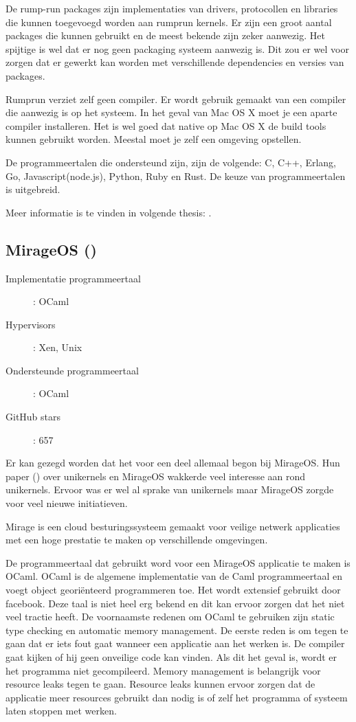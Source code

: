 \documentclass[pdftex,a4paper,12pt,twoside]{report}
\begin{document}
De rump-run packages zijn implementaties van drivers, protocollen en libraries die kunnen toegevoegd worden aan rumprun kernels. Er zijn een groot aantal packages die kunnen gebruikt en de meest bekende zijn zeker aanwezig.
Het spijtige is wel dat er nog geen packaging systeem aanwezig is. Dit zou er wel voor zorgen dat er gewerkt kan worden met verschillende dependencies en versies van packages.

Rumprun verziet zelf geen compiler. Er wordt gebruik gemaakt van een compiler die aanwezig is op het systeem. In het geval van Mac OS X moet je een aparte compiler installeren. Het is wel goed dat native op Mac OS X de build tools kunnen gebruikt worden. Meestal moet je zelf een omgeving opstellen.

De programmeertalen die ondersteund zijn, zijn de volgende: C, C++, Erlang, Go, Javascript(node.js), Python, Ruby en Rust. De keuze van programmeertalen is uitgebreid.

Meer informatie is te vinden in volgende thesis: \cite{kantee_flexible_2012}.

\subsection{MirageOS (\cite{mirage/mirage_0000})}

\begin{description}
  \item [Implementatie programmeertaal]: OCaml
  \item [Hypervisors]: Xen, Unix
  \item [Ondersteunde programmeertaal]: OCaml
  \item [GitHub stars]: 657
\end{description}

Er kan gezegd worden dat het voor een deel allemaal begon bij MirageOS. Hun paper (\cite{madhavapeddy_unikernels_2013}) over unikernels en MirageOS wakkerde veel interesse aan rond unikernels. Ervoor was er wel al sprake van unikernels maar MirageOS zorgde voor veel nieuwe initiatieven.

Mirage is een cloud besturingssysteem gemaakt voor veilige netwerk applicaties met een hoge prestatie te maken op verschillende omgevingen.

De programmeertaal dat gebruikt word voor een MirageOS applicatie te maken is OCaml.
OCaml is de algemene implementatie van de Caml programmeertaal en voegt object georiënteerd programmeren toe. Het wordt extensief gebruikt door facebook. Deze taal is niet heel erg bekend en dit kan ervoor zorgen dat het niet veel tractie heeft.
De voornaamste redenen om OCaml te gebruiken zijn static type checking en automatic memory management. De eerste reden is om tegen te gaan dat er iets fout gaat wanneer een applicatie aan het werken is. De compiler gaat kijken of hij geen onveilige code kan vinden. Als dit het geval is, wordt er het programma niet gecompileerd.
Memory management is belangrijk voor resource leaks tegen te gaan. Resource leaks kunnen ervoor zorgen dat de applicatie meer resources gebruikt dan nodig is of zelf het programma of systeem laten stoppen met werken.
\end{document}
